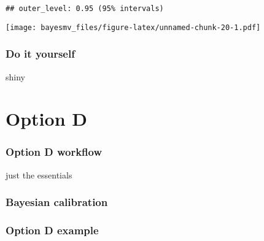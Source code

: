 \documentclass[
]{article}
\begin{document}
\begin{verbatim}
## outer_level: 0.95 (95% intervals)
\end{verbatim}

\texttt{[image: bayesmv\_files/figure-latex/unnamed-chunk-20-1.pdf]}

\hypertarget{do-it-yourself}{%
\section{Do it yourself}\label{do-it-yourself}}

shiny

\hypertarget{part-option-d}{%
\part{Option D}\label{part-option-d}}

\hypertarget{option-d-workflow}{%
\section{Option D workflow}\label{option-d-workflow}}

just the essentials

\hypertarget{bayesian-calibration}{%
\section{Bayesian calibration}\label{bayesian-calibration}}

\hypertarget{option-d-example}{%
\section{Option D example}\label{option-d-example}}

  
\end{document}
